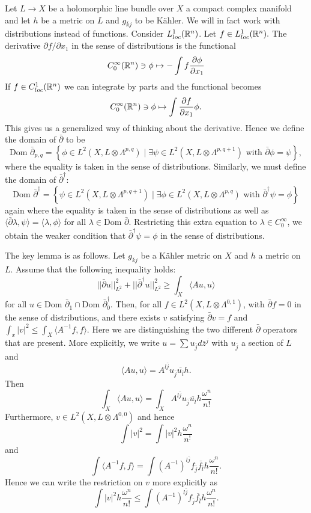 \documentclass{../mathnotes}
\begin{document}
Let $L\to X$ be a holomorphic line bundle over $X$ a compact complex manifold and let $h$ be a metric on $L$
and $g_{\bar kj}$ to be K\"ahler. We will in fact work with distributions instead of functions. Consider
$L^1_{loc}(\mathbb{R}^n)$. Let $f\in L^1_{loc}(\mathbb{R}^n).$ The derivative $\partial f/\partial x_1$ in the sense of
distributions is the functional
\begin{align*}
    C^\infty_0(\mathbb{R}^n)\ni\phi\mapsto -\int f\frac{\partial\phi}{\partial x_1}
\end{align*}
If $f\in C^1_{loc}(\mathbb{R}^n)$ we can integrate by parts and the functional becomes
\[C^\infty_0(\mathbb{R}^n)\ni\phi\mapsto \int\frac{\partial f}{\partial x_1}\phi.\]
This gives us a generalized way of thinking about the derivative. Hence we define the domain of $\bar\partial$
to be \[\text{Dom }\bar\partial_{p,q}=\left\{\phi\in L^2(X,L\otimes\Lambda^{p,q})\mid\exists\psi\in L^2(X,L\otimes\Lambda^{p,q+1})\text{ with }\bar\partial\phi=\psi\right\},\]
where the equality is taken in the sense of distributions. Similarly, we must define the domain of $\bar\partial^\dagger$:
\[\text{Dom }\bar\partial^\dagger=\left\{ \psi\in L^2(X,L\otimes\Lambda^{p,q+1})\mid \exists \phi\in L^2(X,L\otimes\Lambda^{p,q})\text{ with }\bar\partial^\dagger\psi=\phi \right\}\]
again where the equality is taken in the sense of distributions as well as $\langle\bar\partial\lambda,\psi\rangle=\langle\lambda,\phi\rangle$ for all $\lambda\in\text{Dom }\bar\partial$.
Restricting this extra equation to $\lambda\in C^\infty_0$, we obtain the weaker condition that $\bar\partial^\dagger\psi=\phi$ in the sense of distributions.

The key lemma is as follows. Let $g_{\bar kj}$ be a K\"ahler metric on $X$ and $h$ a metric on $L$. Assume that the following
inequality holds:
\[||\bar\partial u||^2_{L^2}+||\bar\partial^\dagger u||^2_{L^2}\geq\int_X \langle Au,u\rangle\]
for all $u\in\text{Dom }\bar\partial_1\cap\text{Dom }\bar\partial^\dagger_0$.
Then, for all $f\in L^2(X,L\otimes \Lambda^{0,1})$, with $\bar\partial f=0$ in the sense of distributions, and there exists $v$
satisfying $\bar\partial v=f$ and $\int_x|v|^2\leq\int_X\langle A^{-1}f,f\rangle$. Here we are distinguishing the two different $\bar\partial$ operators
that are present. More explicitly, we write $u=\sum u_{\bar j}d\bar z^j$ with $u_{\bar j}$ a section of $L$ and
\[\langle Au,u\rangle=A^{l\bar j}u_{\bar j}\overline{u_{\bar l}}h.\]
Then
\[\int_X \langle Au,u\rangle=\int_X A^{l\bar j}u_{\bar j}\overline{u_{\bar l}}h\frac{\omega^n}{n!}\]
Furthermore, $v\in L^2(X,L\otimes \Lambda^{0,0})$ and hence \[\int|v|^2=\int |v|^2h\frac{\omega^n}{n^!}\]
and
\[\int\langle A^{-1}f,f\rangle=\int (A^{-1})^{l\bar j}f_{\bar j}\overline{f_{\bar l}}h\frac{\omega^n}{n!}.\]
Hence we can write the restriction on $v$ more explicitly as
\[\int |v|^2h\frac{\omega^n}{n!}\leq \int (A^{-1})^{l\bar j}f_{\bar j}\overline{f_{\bar l}}h\frac{\omega^n}{n!}.\]
\end{document}
